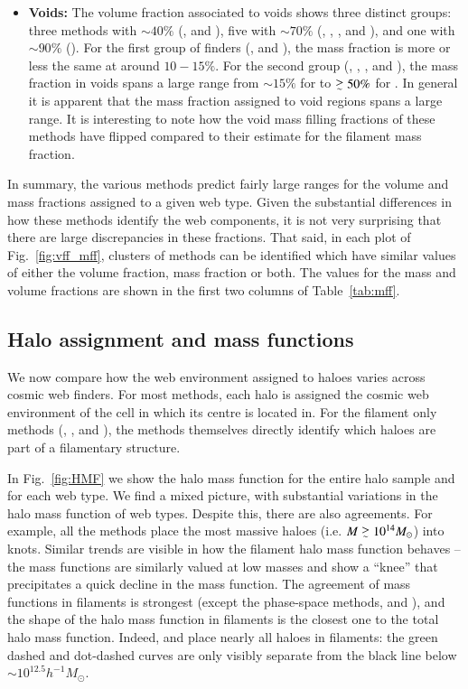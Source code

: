 \begin{itemize}
\item {\bf Voids:} The volume fraction associated to voids shows three distinct groups: three methods with $\sim 40\%$ (\disperse{}, \spine{} and \tweb{}), five with $\sim 70\%$ (\nexus{}, \origami{}, \vweb{}, \mmft{} and \classic{}), and one with $\sim90\%$ (\mswa{}).  For the first group of finders (\disperse{}, \spine{} and \tweb{}), the mass fraction is more or less the same at around $10-15\%$. For the second group (\nexus{}, \origami{}, \vweb{}, \mmft{} and \classic{}), the mass fraction in voids spans a large range from $\sim 15\%$ for \nexus{} to $\gsim50\%$ for \mmft{}. In general it is apparent that the mass fraction assigned to void regions spans a large range. It is interesting to note how the void mass filling fractions of these methods have flipped compared to their estimate for the filament mass fraction.
\end{itemize}

In summary, the various methods predict fairly large ranges for the volume and mass fractions assigned to a given web type. Given the substantial differences in how these methods identify the web components, it is not very surprising that there are large discrepancies in these fractions. That said, in each plot of Fig.~\ref{fig:vff_mff}, clusters of methods can be identified which have similar values of either the volume fraction, mass fraction or both. The values for the mass and volume fractions are shown in the first two columns of Table~\ref{tab:mff}.

\subsection{Halo assignment and mass functions}
We now compare how the web environment assigned to haloes varies across cosmic web finders.  For most methods, each halo is assigned the cosmic web environment of the cell in which its centre is located in. For the filament only methods (\bisous{}, \fine{}, and \mst{}), the methods themselves directly identify which haloes are part of a filamentary structure. 

In Fig.~\ref{fig:HMF} we show the halo mass function for the entire halo sample and for each web type. We find a mixed picture, with substantial variations in the halo mass function of web types. Despite this, there are also agreements. For example, all the methods place the most massive haloes (i.e. $M \gsim 10^{14}M_{\odot}$) into knots. Similar trends are visible in how the filament halo mass function behaves -- the mass functions are similarly valued at low masses and show a ``knee'' that precipitates a quick decline in the mass function. The agreement of mass functions in filaments is strongest (except the phase-space methods, \origami{} and \mswa{}), and the shape of the halo mass function in filaments is the closest one to the total halo mass function. Indeed, \mmft{} and \spine{} place nearly all haloes in filaments: the green dashed and dot-dashed curves are only visibly separate from the black line below $\sim10^{12.5}h^{-1}M_{\odot}$.

